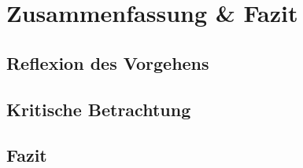 \chapter{Zusammenfassung \& Fazit}\label{chap:zusammenfassung-und-fazit}
\section{Reflexion des Vorgehens}\label{sec:reflexion}
\section{Kritische Betrachtung}\label{sec:kritische-betrachtung}
\section{Fazit}\label{sec:fazit}

